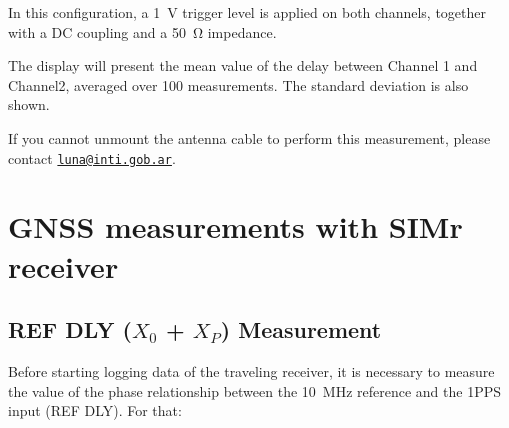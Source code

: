 \documentclass[11pt]{article}
\begin{document}
In this configuration, a \SI{1}{\volt} trigger level is applied on both channels, together with a DC coupling and a \SI{50}{\ohm} impedance.


The display will present the mean value of the delay between Channel 1 and Channel2, averaged over 100 measurements. The standard deviation is also shown.

If you cannot unmount the antenna cable to perform this measurement, please contact \texttt{\url{luna@inti.gob.ar}}.


\section{GNSS measurements with SIMr receiver}
\subsection{REF DLY ($X_0$ + $X_P$) Measurement}
Before starting logging data of the traveling receiver, it is necessary to measure the value of the phase relationship between the \SI{10}{\mega\hertz} reference and the 1PPS input (REF DLY). For that:
\end{document}
